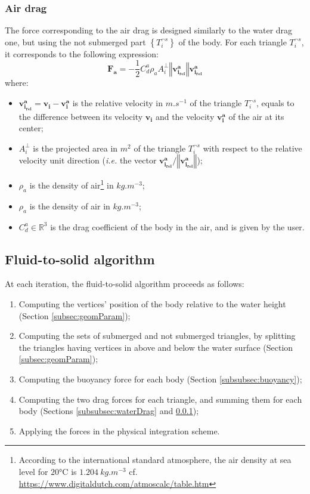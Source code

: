 \documentclass[final]{jcgt}
\def\ie{\emph{i.e.}\xspace}
\begin{document}
\subsubsection{Air drag}
\label{subsubsec:airDrag}
The force corresponding to the air drag is designed similarly to the water drag one, but using the not submerged part $\left\lbrace T_i^{\neg s}\right\rbrace$ of the body.
For each triangle $T_i^{\neg s}$, it corresponds to the following expression:
\begin{equation}
	\mathbf{F_a}= -\frac{1}{2} C_d^a\rho_a A_i^{\perp}\left\Vert\mathbf{v_{i_{rel}}^a}\right\Vert \mathbf{v_{i_{rel}}^a}
\end{equation}
where:
\begin{itemize}
	\item $\mathbf{v_{i_{rel}}^a}=\mathbf{v_i}-\mathbf{v_{i}^a}$ is the relative velocity in $m.s^{-1}$ of the triangle $T_i^{\neg s}$, equals to the difference between its velocity $\mathbf{v_i}$ and the velocity $\mathbf{v_{i}^a}$ of the air at its center;
	\item $A_i^{\perp}$ is the projected area in $m^2$ of the triangle $T_i^{\neg s}$ with respect to the relative velocity unit direction (\ie the vector $\mathbf{v_{i_{rel}}^a}/\left\Vert\mathbf{v_{i_{rel}}^a}\right\Vert$);
	\item $\rho_a$ is the density of air\footnote{According to the international standard atmosphere, the air density at sea level for $20$°C is $1.204~kg.m^{-3}$ cf. \url{https://www.digitaldutch.com/atmoscalc/table.htm}} in $kg.m^{-3}$;
	\item $\rho_a$ is the density of air in $kg.m^{-3}$;
	\item $C_d^a\in\mathbb{R}^3$ is the drag coefficient of the body in the air, and is given by the user.
\end{itemize}

\subsection{Fluid-to-solid algorithm}
\label{subsec:algoForces}
At each iteration, the fluid-to-solid algorithm proceeds as follows:
\begin{enumerate}
	\item Computing the vertices' position of the body relative to the water height (Section \ref{subsec:geomParam});
	\item Computing the sets of submerged and not submerged triangles, by splitting the triangles having vertices in above and below the water surface (Section \ref{subsec:geomParam});
	\item Computing the buoyancy force for each body (Section \ref{subsubsec:buoyancy});
	\item Computing the two drag forces for each triangle, and summing them for each body (Sections \ref{subsubsec:waterDrag} and \ref{subsubsec:airDrag});
	\item Applying the forces in the physical integration scheme.
\end{enumerate}
\end{document}
